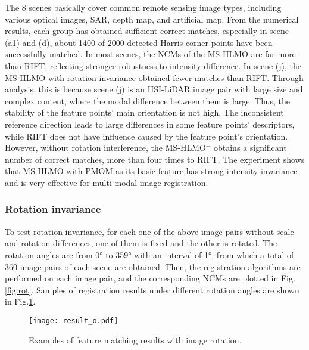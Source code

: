 The 8 scenes basically cover common remote sensing image types, including various optical images, SAR, depth map, and artificial map. From the numerical results, each group has obtained sufficient correct matches, especially in scene (a1) and (d), about 1400 of 2000 detected Harris corner points have been successfully matched. In most scenes, the NCMs of the MS-HLMO are far more than RIFT, reflecting stronger robustness to intensity difference. In scene (j), the MS-HLMO with rotation invariance obtained fewer matches than RIFT. Through analysis, this is because scene (j) is an HSI-LiDAR image pair with large size and complex content, where the modal difference between them is large. Thus, the stability of the feature points' main orientation is not high. The inconsistent reference direction leads to large differences in some feature points' descriptors, while RIFT does not have influence caused by the feature point's orientation. However, without rotation interference, the MS-HLMO$^+$ obtains a significant number of correct matches, more than four times to RIFT. The experiment shows that MS-HLMO with PMOM as its basic feature has strong intensity invariance and is very effective for multi-modal image registration.


\subsubsection{Rotation invariance}

To test rotation invariance, for each one of the above image pairs without scale and rotation differences, one of them is fixed and the other is rotated. The rotation angles are from 0° to 359° with an interval of 1°, from which a total of 360 image pairs of each scene are obtained. Then, the registration algorithms are performed on each image pair, and the corresponding NCMs are plotted in Fig.\ref{fig:rot}. Samples of registration results under different rotation angles are shown in Fig.\ref{fig:rot_r}.

\begin{figure}[!h]
 \begin{center}
  \texttt{[image: result\_o.pdf]}
  \caption{Examples of feature matching results with image rotation.}
  \label{fig:rot_r}
 \end{center}
\end{figure}

